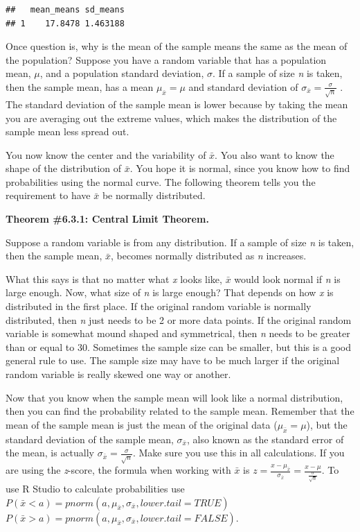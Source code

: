 \documentclass[
]{book}
\begin{document}
\begin{verbatim}
##   mean_means sd_means
## 1    17.8478 1.463188
\end{verbatim}

Once question is, why is the mean of the sample means the same as the mean of the population? Suppose you have a random variable that has a population mean, \(\mu\), and a population standard deviation, \(\sigma\). If a sample of size \emph{n} is taken, then the sample mean, has a mean \(\mu_{ \bar{x}}=\mu\) and standard deviation of \(\sigma_{ \bar{x}}=\frac{\sigma}{\sqrt{n}}\) . The standard deviation of the sample mean is lower because by taking the mean you are averaging out the extreme values, which makes the distribution of the sample mean less spread out.

You now know the center and the variability of \(\bar{x}\). You also want to know the shape of the distribution of \(\bar{x}\). You hope it is normal, since you know how to find probabilities using the normal curve. The following theorem tells you the requirement to have \(\bar{x}\) be normally distributed.

\textbf{Theorem \#6.3.1: Central Limit Theorem.}

Suppose a random variable is from any distribution. If a sample of size \emph{n} is taken, then the sample mean, \(\bar{x}\), becomes normally distributed as \emph{n} increases.

What this says is that no matter what \emph{x} looks like, \(\bar{x}\) would look normal if \emph{n} is large enough. Now, what size of \emph{n} is large enough? That depends on how \emph{x} is distributed in the first place. If the original random variable is normally distributed, then \emph{n} just needs to be 2 or more data points. If the original random variable is somewhat mound shaped and symmetrical, then \emph{n} needs to be greater than or equal to 30. Sometimes the sample size can be smaller, but this is a good general rule to use. The sample size may have to be much larger if the original random variable is really skewed one way or another.

Now that you know when the sample mean will look like a normal distribution, then you can find the probability related to the sample mean. Remember that the mean of the sample mean is just the mean of the original data (\(\mu_{\bar{x}}=\mu\)), but the standard deviation of the sample mean, \(\sigma_{\bar{x}}\), also known as the standard error of the mean, is actually \(\sigma_{\bar{x}}=\frac{\sigma}{\sqrt{n}}\). Make sure you use this in all calculations. If you are using the \emph{z}-score, the formula when working with \(\bar{x}\) is \(z=\frac{x-\mu_{\bar{x}}}{\sigma_{\bar{x}}}=\frac{x-\mu}{\frac{\sigma}{\sqrt{n}}}\).
To use R Studio to calculate probabilities use
\(P(\bar{x}<a)= pnorm(a, \mu_{\bar{x}}, \sigma_{\bar{x}}, lower.tail=TRUE)\)
\(P(\bar{x}>a)= pnorm(a, \mu_{\bar{x}}, \sigma_{\bar{x}}, lower.tail=FALSE)\).
\end{document}
